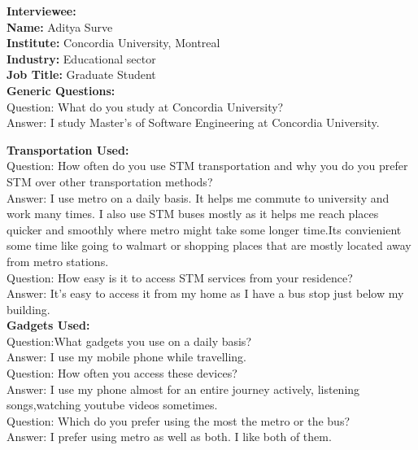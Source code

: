 \documentclass[11pt, english]{report}
\begin{document}
\textbf{Interviewee:}\\

\textbf{Name:} Aditya Surve \\
\textbf{Institute:} Concordia University, Montreal \\
\textbf{Industry:} Educational sector\\
\textbf{Job Title:} Graduate Student\\ 


\textbf{Generic Questions:}\\

Question: What do you study at Concordia University? \\
Answer: I study Master's of Software Engineering at Concordia University.

\textbf{Transportation Used:}\\

Question: How often do you use STM transportation and why you do you prefer STM over other transportation methods?\\
Answer: I use metro on a daily basis. It helps me commute to university and work many times. I also use STM buses mostly as it helps me reach places quicker and smoothly where metro might take some longer time.Its convienient some time like going to walmart or shopping places that are mostly located away from metro stations.\\

Question: How easy is it to access STM services from your residence?\\
Answer: It's easy to access it from my home as I have a bus stop just below my building.\\

\textbf{Gadgets Used:}\\

Question:What gadgets you use on a daily basis?\\
Answer: I use my mobile phone while travelling.\\

Question: How often you access these devices?\\
Answer: I use my phone almost for an entire journey actively, listening songs,watching youtube videos sometimes.\\

Question: Which do you prefer using the most the metro or the bus?\\
Answer: I prefer using metro as well as both. I like both of them.\\
\end{document}
